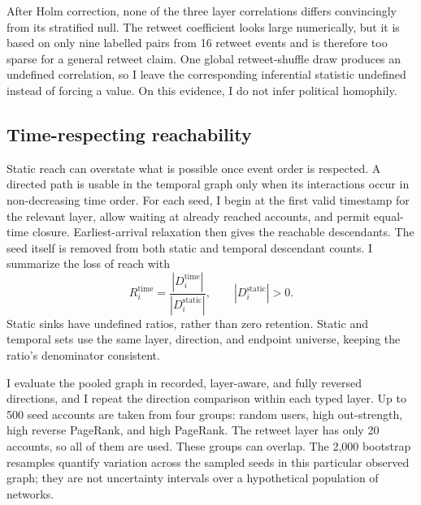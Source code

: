 \documentclass[11pt,a4paper]{article}
\begin{document}
After Holm correction, none of the three layer correlations differs convincingly from its stratified null. The retweet coefficient looks large numerically, but it is based on only nine labelled pairs from 16 retweet events and is therefore too sparse for a general retweet claim. One global retweet-shuffle draw produces an undefined correlation, so I leave the corresponding inferential statistic undefined instead of forcing a value. On this evidence, I do not infer political homophily.
\FloatBarrier

\subsection{Time-respecting reachability}
Static reach can overstate what is possible once event order is respected. A directed path is usable in the temporal graph only when its interactions occur in non-decreasing time order. For each seed, I begin at the first valid timestamp for the relevant layer, allow waiting at already reached accounts, and permit equal-time closure. Earliest-arrival relaxation then gives the reachable descendants. The seed itself is removed from both static and temporal descendant counts. I summarize the loss of reach with
\begin{equation}
R_i^{\mathrm{time}}=\frac{|D_i^{\mathrm{time}}|}{|D_i^{\mathrm{static}}|},\qquad |D_i^{\mathrm{static}}|>0.
\end{equation}
Static sinks have undefined ratios, rather than zero retention. Static and temporal sets use the same layer, direction, and endpoint universe, keeping the ratio's denominator consistent.

I evaluate the pooled graph in recorded, layer-aware, and fully reversed directions, and I repeat the direction comparison within each typed layer. Up to 500 seed accounts are taken from four groups: random users, high out-strength, high reverse PageRank, and high PageRank. The retweet layer has only 20 accounts, so all of them are used. These groups can overlap. The 2,000 bootstrap resamples quantify variation across the sampled seeds in this particular observed graph; they are not uncertainty intervals over a hypothetical population of networks.
\end{document}
